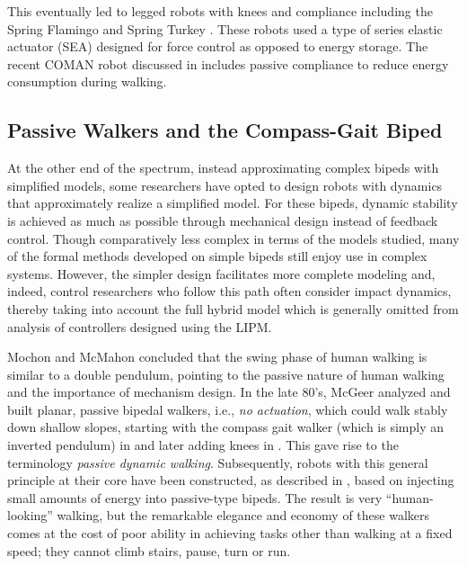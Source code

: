 This eventually led to legged robots with knees and compliance including the
Spring Flamingo and Spring Turkey \cite{Hollerbach1992, Pratt1999, Pratt2000,
  Pratt2001}.
%
These robots used a type of series elastic actuator (SEA) designed for force
control as opposed to energy storage.
%
The recent COMAN robot discussed in \cite{Li2013} includes passive
compliance to reduce energy consumption during walking.


\subsection{Passive Walkers and the Compass-Gait Biped} \label{sec:literature-passive-walkers}

At the other end of the spectrum, instead approximating complex bipeds with
simplified models, some researchers have opted to design robots with dynamics
that approximately realize a simplified model.
%
For these bipeds, dynamic stability is achieved as much as possible through
mechanical design instead of feedback control.
%
Though comparatively less complex in terms of the models studied, many of the
formal methods developed on simple bipeds still enjoy use in complex systems.
%
However, the simpler design facilitates more complete modeling and, indeed,
control researchers who follow this path often consider impact dynamics, thereby
taking into account the full hybrid model which is generally omitted from
analysis of controllers designed using the LIPM.
%

Mochon and McMahon \cite{Mochon1980} concluded that the swing phase of human
walking is similar to a double pendulum, pointing to the passive nature of human
walking and the importance of mechanism design.
%
In the late 80's, McGeer analyzed and built planar, passive bipedal walkers,
i.e., {\em no actuation}, which could walk stably down shallow slopes, starting
with the compass gait walker (which is simply an inverted pendulum) in
\cite{McGeer1990} and later adding knees in \cite{McGeer1990a}.
%
This gave rise to the terminology {\em passive dynamic walking}.
%
Subsequently, robots with this general principle at their core have been
constructed, as described in \cite{Collins2005}, based on injecting small
amounts of energy into passive-type bipeds.
%
The result is very ``human-looking'' walking, but the remarkable elegance and
economy of these walkers comes at the cost of poor ability in achieving tasks
other than walking at a fixed speed;
%
they cannot climb stairs, pause, turn or run.
%


